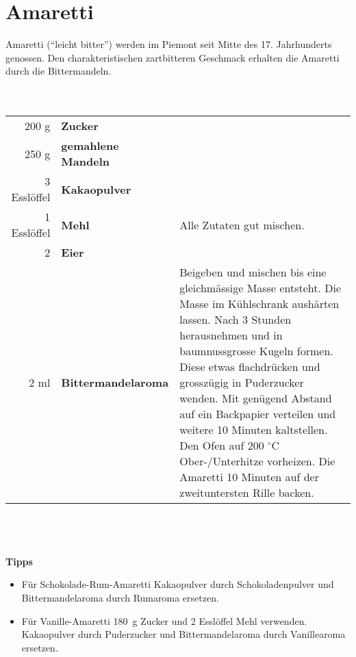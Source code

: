 \section{Amaretti}
Amaretti (``leicht bitter'') werden im Piemont seit Mitte des 17. Jahrhunderts genossen. Den charakteristischen zartbitteren Geschmack erhalten die Amaretti durch die Bittermandeln.
\\
\\
\\
\begin{tabularx}{\linewidth}{r>{\bfseries\textbf}lX}
	200 g & Zucker & \\
	250 g & gemahlene Mandeln & \\
	3 Esslöffel & Kakaopulver &\\
	1 Esslöffel & Mehl & Alle Zutaten gut mischen.\\
	2 & Eier &\\
	2 ml & Bittermandelaroma & Beigeben und mischen bis eine gleichmässige Masse entsteht.\newline\newline
												Die Masse im Kühlschrank aushärten lassen. Nach 3 Stunden herausnehmen und in baumnussgrosse Kugeln formen. Diese etwas flachdrücken und grosszügig in Puderzucker wenden. Mit genügend Abstand auf ein Backpapier verteilen und weitere 10 Minuten kaltstellen. Den Ofen auf 200 $^{\circ}$C Ober-/Unterhitze vorheizen.\newline\newline
Die Amaretti 10 Minuten auf der zweituntersten Rille backen.
\end{tabularx}
\\
\\
\\
\textbf{Tipps}
\begin{itemize}
	\item Für Schokolade-Rum-Amaretti Kakaopulver durch Schokoladenpulver und Bittermandelaroma durch Rumaroma ersetzen.
	\item Für Vanille-Amaretti 180~g Zucker und 2 Esslöffel Mehl verwenden. Kakaopulver durch Puderzucker und Bittermandelaroma durch Vanillearoma ersetzen.
\end{itemize}
\newpage


